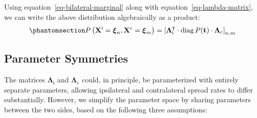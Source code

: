 \documentclass[
  sn-mathphys-num,
]{sn-jnl}
\begin{document}
Using equation~\ref{eq-bilateral-marginal} along with
equation~\ref{eq-lambda-matrix}, we can write the above distribution
algebraically as a product:
%
\begin{equation}\phantomsection\label{eq-bilateral-marginal-algebra}{
P \left( \mathbf{X}^\text{i} = \boldsymbol{\xi}_n, \mathbf{X}^\text{c} = \boldsymbol{\xi}_m \right) = \left[ \boldsymbol{\Lambda}^\intercal_\text{i} \cdot \operatorname{diag} P(\mathbf{t}) \cdot \boldsymbol{\Lambda}_\text{c} \right]_{n,m}
}\end{equation}

\subsection{Parameter Symmetries}\label{sec-params-symmetry}

The matrices \(\boldsymbol{\Lambda}_\text{i}\) and
\(\boldsymbol{\Lambda}_\text{c}\) could, in principle, be parameterized
with entirely separate parameters, allowing ipsilateral and
contralateral spread rates to differ substantially. However, we simplify
the parameter space by sharing parameters between the two sides, based
on the following three assumptions:
\end{document}
